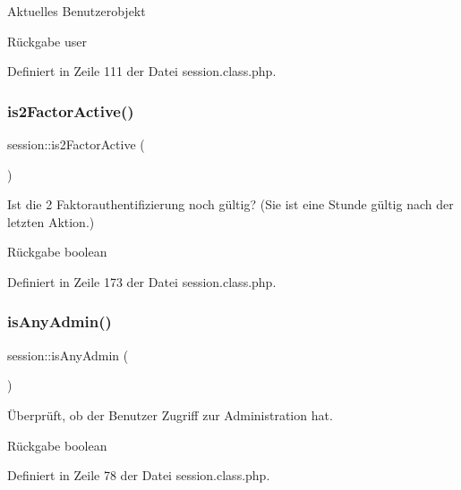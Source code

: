 Aktuelles Benutzerobjekt \begin{DoxyReturn}{Rückgabe}
user 
\end{DoxyReturn}


Definiert in Zeile 111 der Datei session.\+class.\+php.

\mbox{\label{classsession_a2c8aa6e6d677a289c41027af02154098}} 
\subsubsection{\texorpdfstring{is2\+Factor\+Active()}{is2FactorActive()}}
{\footnotesize\ttfamily session\+::is2\+Factor\+Active (\begin{DoxyParamCaption}{ }\end{DoxyParamCaption})}

Ist die 2 Faktorauthentifizierung noch gültig? (Sie ist eine Stunde gültig nach der letzten Aktion.) \begin{DoxyReturn}{Rückgabe}
boolean 
\end{DoxyReturn}


Definiert in Zeile 173 der Datei session.\+class.\+php.

\mbox{\label{classsession_ad73cba9f4035a4a56fd9408cc3deee40}} 
\subsubsection{\texorpdfstring{is\+Any\+Admin()}{isAnyAdmin()}}
{\footnotesize\ttfamily session\+::is\+Any\+Admin (\begin{DoxyParamCaption}{ }\end{DoxyParamCaption})}

Überprüft, ob der Benutzer Zugriff zur Administration hat. \begin{DoxyReturn}{Rückgabe}
boolean 
\end{DoxyReturn}


Definiert in Zeile 78 der Datei session.\+class.\+php.

\mbox{\label{classsession_ae411fc8f5203114bec3e5ec1db754d56}} 

